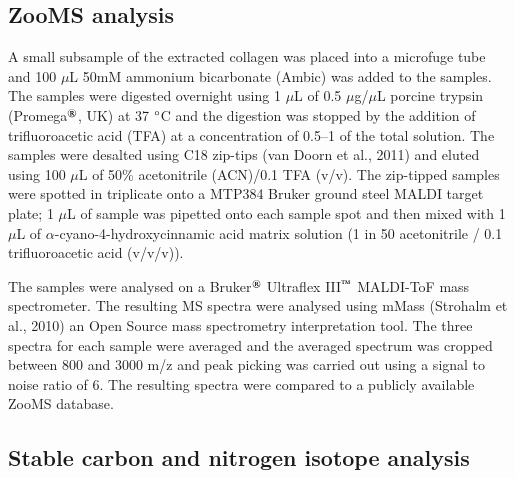 \documentclass[review]{elsarticle} %
\begin{document}
\hypertarget{zooms-analysis}{%
\subsection{ZooMS analysis}\label{zooms-analysis}}

A small subsample of the extracted collagen was placed into a microfuge tube and 100 \(\mu\)L 50mM ammonium bicarbonate (Ambic) was added to the samples. The samples were digested overnight using 1 \(\mu\)L of 0.5 \(\mu\)g/\(\mu\)L porcine trypsin (Promega\(^\text{\textregistered}\), UK) at 37 \(\text{\textdegree}\)C and the digestion was stopped by the addition of trifluoroacetic acid (TFA) at a concentration of 0.5--1\(%
\) of the total solution. The samples were desalted using C18 zip-tips (van Doorn et al., 2011) and eluted using 100 \(\mu\)L of 50\% acetonitrile (ACN)/0.1\(%
\) TFA (v/v). The zip-tipped samples were spotted in triplicate onto a MTP384 Bruker ground steel MALDI target plate; 1 \(\mu\)L of sample was pipetted onto each sample spot and then mixed with 1 \(\mu\)L of \(\alpha\)-cyano-4-hydroxycinnamic acid matrix solution (1\(%
\) in 50\(%
\) acetonitrile / 0.1\(%
\) trifluoroacetic acid (v/v/v)).

The samples were analysed on a Bruker\(^\text{\textregistered}\) Ultraflex III\(^\text{\texttrademark}\) MALDI-ToF mass spectrometer. The resulting MS spectra were analysed using mMass (Strohalm et al., 2010) an Open Source mass spectrometry interpretation tool. The three spectra for each sample were averaged and the averaged spectrum was cropped between 800 and 3000 m/z and peak picking was carried out using a signal to noise ratio of 6. The resulting spectra were compared to a publicly available ZooMS database.

\hypertarget{stable-carbon-and-nitrogen-isotope-analysis}{%
\subsection{Stable carbon and nitrogen isotope analysis}\label{stable-carbon-and-nitrogen-isotope-analysis}}
\end{document}
